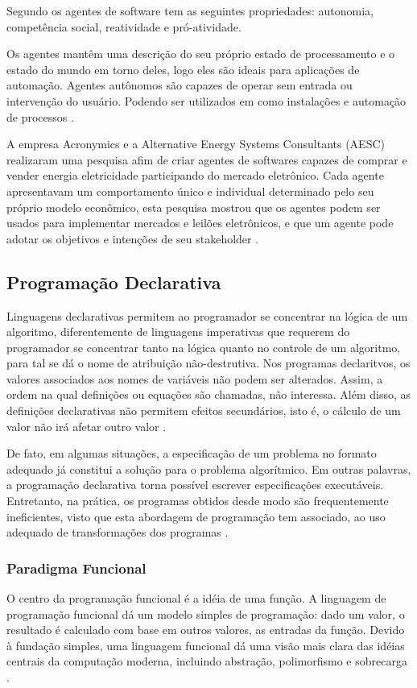 Segundo  os agentes de software tem as seguintes propriedades: autonomia, competência social, reatividade e  pró-atividade.

Os agentes mantêm uma descrição do seu próprio estado de processamento e o estado do mundo em torno deles, logo eles são ideais para aplicações de automação. Agentes autônomos são capazes de operar sem entrada ou intervenção do usuário. Podendo ser utilizados em como instalações e automação de processos \cite{agentBuilderWhy}.

A empresa Acronymics e a Alternative Energy Systems Consultants (AESC) realizaram uma pesquisa afim de criar agentes de softwares capazes de comprar e vender energia eletricidade participando do mercado eletrônico. Cada agente apresentavam um comportamento único e individual determinado pelo seu próprio modelo econômico, esta pesquisa mostrou que os agentes podem ser usados para implementar mercados e leilões eletrônicos, e que um agente pode adotar os objetivos e intenções de seu stakeholder \cite{agentBuilder}.

\subsection{Programação Declarativa}

Linguagens declarativas permitem ao programador se concentrar na lógica de um algoritmo, diferentemente de linguagens imperativas que requerem do programador se concentrar tanto na lógica quanto no controle de um algoritmo, para tal se dá o nome de atribuição não-destrutiva. Nos programas declaritvos, os valores associados aos nomes de variáveis não podem ser alterados. Assim, a ordem na qual definições ou equações são chamadas, não interessa. Além disso, as definições declarativas não permitem efeitos secundários, isto é, o cálculo de um  valor não irá afetar outro valor \cite{coenen}.

De fato, em algumas situações, a especificação de um problema no formato adequado já constitui a solução para o problema algorítmico. Em outras palavras, a programação declarativa torna possível escrever especificações executáveis. Entretanto, na prática, os programas obtidos desde modo são frequentemente ineficientes, visto que esta abordagem de programação tem associado, ao uso adequado de transformações dos programas \cite[pág.~2]{apt1996}.

\subsubsection{Paradigma Funcional}
O centro da programação funcional é a idéia de uma função. A linguagem de programação funcional dá um modelo simples de programação: dado um valor, o resultado é calculado com base em outros valores, as entradas da função. Devido à fundação simples, uma linguagem funcional dá uma visão mais clara das idéias centrais da computação moderna, incluindo abstração, polimorfismo e sobrecarga \cite[pág.~16]{thompson1999}.

